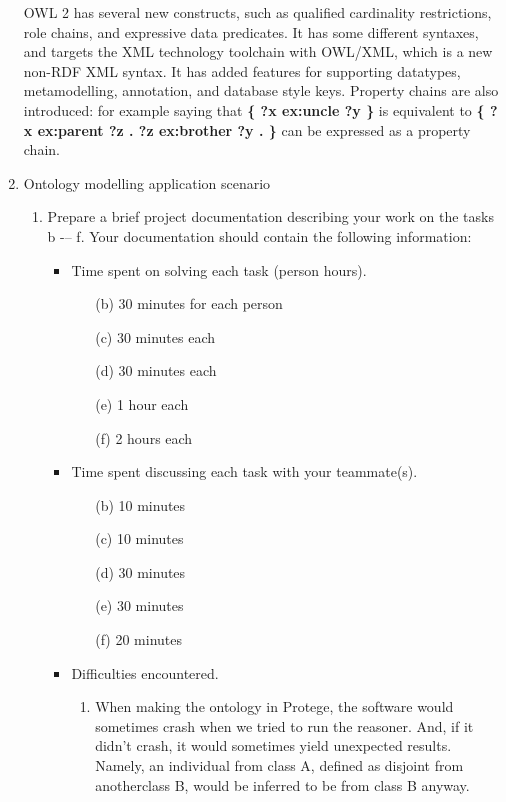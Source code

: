 \documentclass[10pt,a4paper]{article}
\begin{document}
\begin{enumerate}
OWL 2 has several new constructs, such as qualified cardinality restrictions, role chains, and expressive data predicates. It has some different syntaxes, and targets the XML technology toolchain with OWL/XML, which is a new non-RDF XML syntax. It has added features for supporting datatypes, metamodelling, annotation, and database style keys. Property chains are also introduced: for example saying that \textbf{\{ ?x ex:uncle ?y \}} is equivalent to \textbf{\{ ?x ex:parent ?z . ?z ex:brother ?y . \}} can be expressed as a property chain.

\item Ontology modelling application scenario

\begin{enumerate}

\item Prepare a brief project documentation describing your work on the tasks b -– f.
Your documentation should contain the following information:
	\begin{itemize}
		\item Time spent on solving each task (person hours).
			\begin{enumerate}
			\item[(b)] 30 minutes for each person
			\item[(c)] 30 minutes each
			\item[(d)] 30 minutes each
			\item[(e)] 1 hour each
			\item[(f)] 2 hours each
			\end{enumerate}
		\item Time spent discussing each task with your teammate(s).
			\begin{enumerate}
			\item[(b)] 10 minutes
			\item[(c)] 10 minutes
			\item[(d)] 30 minutes
			\item[(e)] 30 minutes
			\item[(f)] 20 minutes
			\end{enumerate}
		\item Difficulties encountered.
			\begin{enumerate}
			\item When making the ontology in Protege, the software would sometimes crash when we tried to run the reasoner. And, if it didn't crash, it would sometimes yield unexpected results. Namely, an individual from class A, defined as disjoint from anotherclass B, would be inferred to be from class B anyway.

\end{enumerate}
\end{itemize}
\end{enumerate}
\end{enumerate}
\end{document}
